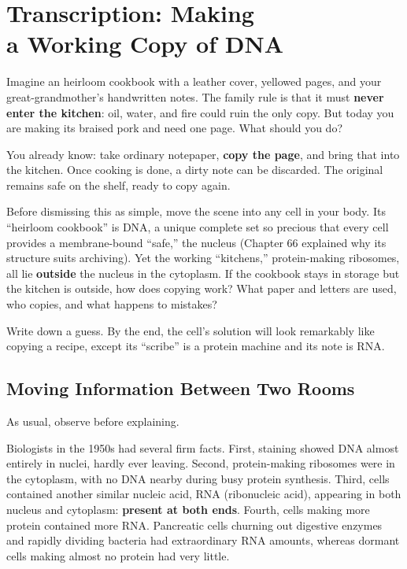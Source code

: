 \chapter[Transcription: Making a Working Copy of DNA]{Transcription: Making\protect\\ a Working Copy of DNA}

\begin{kaichang}
Imagine an heirloom cookbook with a leather cover, yellowed pages, and your great-grandmother's handwritten notes. The family rule is that it must \textbf{never enter the kitchen}: oil, water, and fire could ruin the only copy. But today you are making its braised pork and need one page. What should you do?

You already know: take ordinary notepaper, \textbf{copy the page}, and bring that into the kitchen. Once cooking is done, a dirty note can be discarded. The original remains safe on the shelf, ready to copy again.

Before dismissing this as simple, move the scene into any cell in your body. Its ``heirloom cookbook'' is DNA, a unique complete set so precious that every cell provides a membrane-bound ``safe,'' the nucleus (Chapter 66 explained why its structure suits archiving). Yet the working ``kitchens,'' protein-making ribosomes, all lie \textbf{outside} the nucleus in the cytoplasm. If the cookbook stays in storage but the kitchen is outside, how does copying work? What paper and letters are used, who copies, and what happens to mistakes?

Write down a guess. By the end, the cell's solution will look remarkably like copying a recipe, except its ``scribe'' is a protein machine and its note is RNA.
\end{kaichang}

\section{Moving Information Between Two Rooms}

As usual, observe before explaining.

Biologists in the 1950s had several firm facts. First, staining showed DNA almost entirely in nuclei, hardly ever leaving. Second, protein-making ribosomes were in the cytoplasm, with no DNA nearby during busy protein synthesis. Third, cells contained another similar nucleic acid, RNA (ribonucleic acid), appearing in both nucleus and cytoplasm: \textbf{present at both ends}. Fourth, cells making more protein contained more RNA. Pancreatic cells churning out digestive enzymes and rapidly dividing bacteria had extraordinary RNA amounts, whereas dormant cells making almost no protein had very little.


